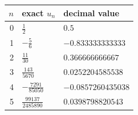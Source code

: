 \begin{tabular}{@{}rll@{}}
\toprule
$n$ & exact $u_n$ & decimal value \\
\midrule
0 & $\frac{1}{2}$ & $0.5$ \\
1 & $- \frac{5}{6}$ & $-0.833333333333$ \\
2 & $\frac{11}{30}$ & $0.366666666667$ \\
3 & $\frac{143}{5670}$ & $0.0252204585538$ \\
4 & $- \frac{7291}{85050}$ & $-0.0857260435038$ \\
5 & $\frac{99137}{2485890}$ & $0.0398798820543$ \\
\bottomrule
\end{tabular}
